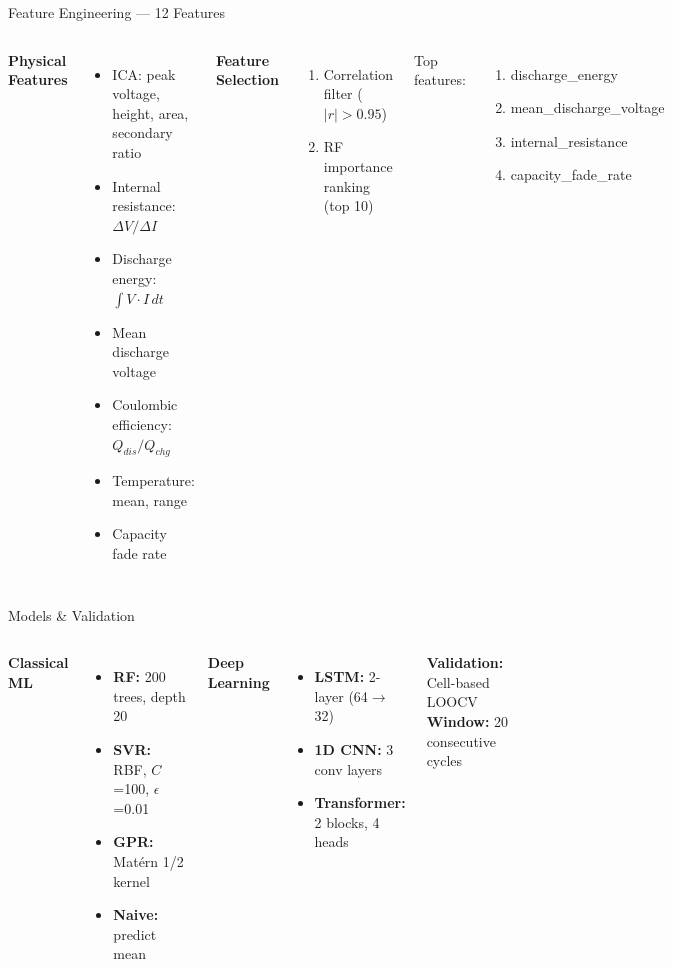 \documentclass[aspectratio=169,11pt]{beamer}
\begin{document}
\begin{frame}{Feature Engineering --- 12 Features}
\begin{columns}
\textbf{Physical Features}
\begin{itemize}[nosep,small]
    \item ICA: peak voltage, height, area, secondary ratio
    \item Internal resistance: $\Delta V / \Delta I$
    \item Discharge energy: $\int V \cdot I \, dt$
    \item Mean discharge voltage
    \item Coulombic efficiency: $Q_{dis} / Q_{chg}$
    \item Temperature: mean, range
    \item Capacity fade rate
\end{itemize}

\textbf{Feature Selection}
\begin{enumerate}
    \item Correlation filter ($|r| > 0.95$)
    \item RF importance ranking (top 10)
\end{enumerate}
\vspace{1em}
Top features:
\begin{enumerate}
    \item discharge\_energy
    \item mean\_discharge\_voltage
    \item internal\_resistance
    \item capacity\_fade\_rate
\end{enumerate}
\end{columns}
\end{frame}

\begin{frame}{Models \& Validation}
\begin{columns}
\textbf{Classical ML}
\begin{itemize}[nosep,small]
    \item \textbf{RF:} 200 trees, depth 20
    \item \textbf{SVR:} RBF, $C$=100, $\epsilon$=0.01
    \item \textbf{GPR:} Mat\'ern 1/2 kernel
    \item \textbf{Naive:} predict mean
\end{itemize}

\textbf{Deep Learning}
\begin{itemize}[nosep,small]
    \item \textbf{LSTM:} 2-layer (64$\to$32)
    \item \textbf{1D CNN:} 3 conv layers
    \item \textbf{Transformer:} 2 blocks, 4 heads
\end{itemize}
\vspace{0.5em}
\textbf{Validation:} Cell-based LOOCV\\
\textbf{Window:} 20 consecutive cycles
\end{columns}
\end{frame}
\end{document}
